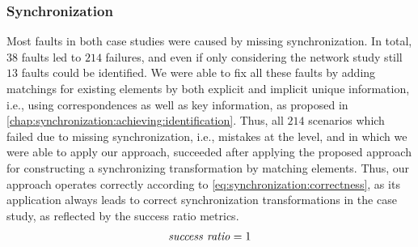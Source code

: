 


\subsubsection{Synchronization}

Most faults in both case studies were caused by missing synchronization.
In total, $38$ faults led to $214$ failures, and even if only considering the network study still $13$ faults could be identified.
We were able to fix all these faults by adding matchings for existing elements by both explicit and implicit unique information, i.e., using correspondences as well as key information, as proposed in \autoref{chap:synchronization:achieving:identification}.
Thus, all $214$ scenarios which failed due to missing synchronization, i.e., mistakes at the \leveltransformation level, and in which we were able to apply our approach, succeeded after applying the proposed approach for constructing a synchronizing transformation by matching elements.
Thus, our approach operates correctly according to \autoref{eq:synchronization:correctness}, as its application always leads to correct synchronization transformations in the case study, as reflected by the success ratio metrics.
\begin{align*}
    \mathit{success\ ratio} = 1
\end{align*}

